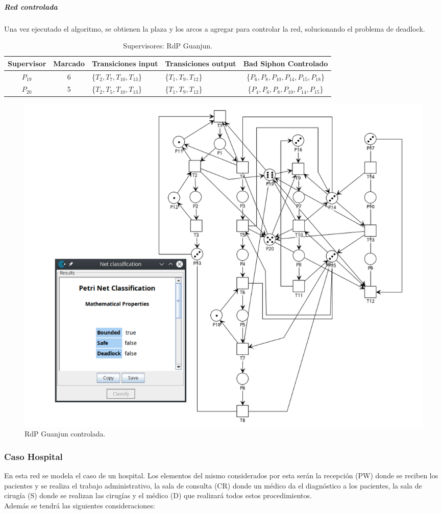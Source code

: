 \subparagraph{Red controlada}
\hfill \break
Una vez ejecutado el algoritmo, se obtienen la plaza y los arcos a agregar para controlar la red, solucionando el problema de deadlock.\\

\begin{table}[H]
    \centering
    \begin{tabular}{|c|c|P{2.5cm}|P{2.2cm}|c|}
    \hline
    \textbf{Supervisor} & \textbf{Marcado} & \textbf{Transiciones input} & \textbf{Transiciones output} & \textbf{Bad Siphon Controlado}  \\  \hline
    $P_{19}$ & 6 & \{$T_{2}, T_{7}, T_{10}, T_{13}$\} & \{$T_{1}, T_{9}, T_{12}$\} & \{$P_6,P_{8},P_{10},P_{14},P_{15},P_{18}$\} \\ 
    \hline
    $P_{20}$ & 5 & \{$T_{2}, T_{5}, T_{10}, T_{13}$\} & \{$T_{1}, T_{9}, T_{12}$\} & \{$P_4,P_{6},P_{8},P_{10},P_{14},P_{15}$\} \\ 
    \hline
    \end{tabular}
    \label{tab:guanjun}
    \caption{Supervisores: RdP Guanjun.}
    \end{table}
\bigskip

\begin{figure}[H]
	\centering
	\includegraphics[scale=0.5]{Figures/algoritmo3/Guanjun2.png}
	\caption{RdP Guanjun controlada.}
	\label{fig:guanjuncontrolada}
 \end{figure}
\bigskip

\subsubsection{Caso Hospital} \label{sub:Hospital}
En esta red se modela el caso de un hospital. Los elementos del mismo considerados por esta serán la recepción (PW) donde se reciben los pacientes y se realiza el trabajo administrativo, la sala de consulta (CR) donde un médico da el diagnóstico a los pacientes, la sala de cirugía (S) donde se realizan las cirugías y el médico (D) que realizará todos estos procedimientos.\\
Además se tendrá las siguientes consideraciones:

